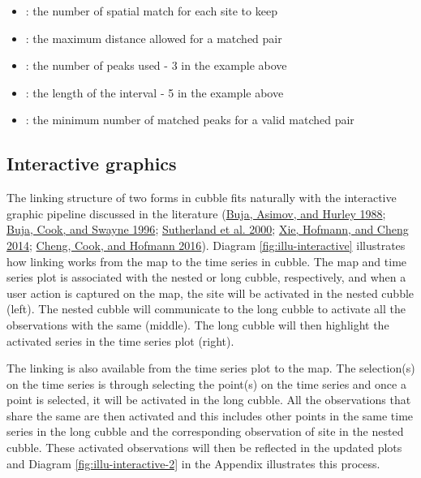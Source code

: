 \documentclass{article}
\providecommand{\tightlist}{%
  \setlength{\itemsep}{0pt}\setlength{\parskip}{0pt}}
\begin{document}
\begin{itemize}
\tightlist
\item
  : the number of spatial match for each site to keep
\item
  : the maximum distance allowed for a matched pair
\item
  : the number of peaks used - 3 in the example above
\item
  : the length of the interval - 5 in the example above
\item
  : the minimum number of matched peaks for a valid matched pair
\end{itemize}

\hypertarget{interactive-graphics}{%
\subsection{Interactive graphics}\label{interactive-graphics}}

The linking structure of two forms in cubble fits naturally with the interactive graphic pipeline discussed in the literature (\protect\hyperlink{ref-buja1988elements}{Buja, Asimov, and Hurley 1988}; \protect\hyperlink{ref-buja1996interactive}{Buja, Cook, and Swayne 1996}; \protect\hyperlink{ref-sutherland2000orca}{Sutherland et al. 2000}; \protect\hyperlink{ref-xie2014reactive}{Xie, Hofmann, and Cheng 2014}; \protect\hyperlink{ref-cheng2016enabling}{Cheng, Cook, and Hofmann 2016}). Diagram \ref{fig:illu-interactive} illustrates how linking works from the map to the time series in cubble. The map and time series plot is associated with the nested or long cubble, respectively, and when a user action is captured on the map, the site will be activated in the nested cubble (left). The nested cubble will communicate to the long cubble to activate all the observations with the same  (middle). The long cubble will then highlight the activated series in the time series plot (right).

The linking is also available from the time series plot to the map. The selection(s) on the time series is through selecting the point(s) on the time series and once a point is selected, it will be activated in the long cubble. All the observations that share the same  are then activated and this includes other points in the same time series in the long cubble and the corresponding observation of site in the nested cubble. These activated observations will then be reflected in the updated plots and Diagram \ref{fig:illu-interactive-2} in the Appendix illustrates this process.
\end{document}
